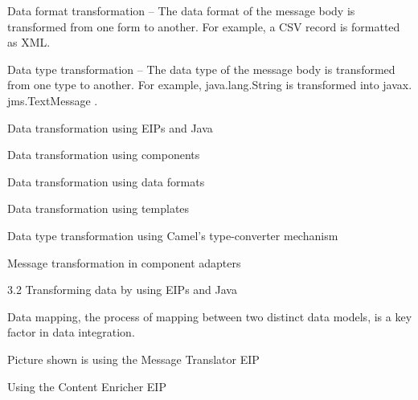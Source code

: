 \documentclass[Screen16to9,17pt]{foils}
\begin{document}


\begin{list2}
\item Data format transformation -- The data format of the message body is transformed
from one form to another. For example, a CSV record is formatted as XML.
\item Data type transformation -- The data type of the message body is transformed from
one type to another. For example, java.lang.String is transformed into javax.
jms.TextMessage .
\end{list2}


\begin{list2}
\item Data transformation using EIPs and Java
\item Data transformation using components
\item Data transformation using data formats
\item Data transformation using templates
\item Data type transformation using Camel’s
type-converter mechanism
\item Message transformation in component adapters
\end{list2}




\begin{list2}

\item 3.2 Transforming data by using EIPs and Java
\item Data mapping, the process of mapping between two distinct data models, is a key factor in data integration.
\item Picture shown is using the Message Translator EIP
\end{list2}


\begin{list2}

\item Using the Content Enricher EIP
\end{list2}
\end{document}
